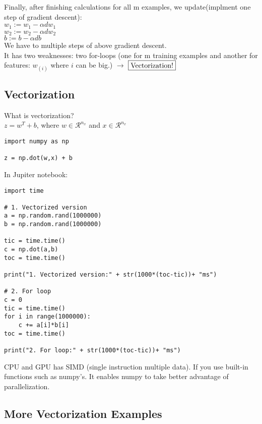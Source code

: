 \documentclass{article}
\begin{document}
Finally, after finishing calculations for all m examples, we update(implment one step of gradient descent):\\

$w_1 := w_1 - \alpha dw_1$\\
$w_2 := w_2 - \alpha dw_2$\\
$b := b - \alpha db $\\

We have to multiple steps of above gradient descent.\\

It has two weaknesses: two for-loops (one for m training examples and another for features: $w_{(i)}$ where $i$ can be big.) $\rightarrow$ $\fbox{Vectorization!}$

\newpage
\subsection{Vectorization}

What is vectorization?\\

$z = w^T+b$, where $w \in \mathcal{R}^{n_x}$ and $x \in \mathcal{R}^{n_x}$\\
\lstset{language=Python}
\begin{lstlisting}
import numpy as np

z = np.dot(w,x) + b
\end{lstlisting}


In Jupiter notebook:\\

\lstset{language=Python}
\begin{lstlisting}
import time

# 1. Vectorized version
a = np.random.rand(1000000)
b = np.random.rand(1000000)

tic = time.time()
c = np.dot(a,b)
toc = time.time()

print("1. Vectorized version:" + str(1000*(toc-tic))+ "ms")

# 2. For loop
c = 0
tic = time.time()
for i in range(1000000):
    c += a[i]*b[i]
toc = time.time()

print("2. For loop:" + str(1000*(toc-tic))+ "ms")
\end{lstlisting}

CPU and GPU has SIMD (single instruction multiple data). If you use built-in functions such as numpy's. It enables numpy to take better advantage of parallelization.

\newpage
\subsection{More Vectorization Examples}
\end{document}
